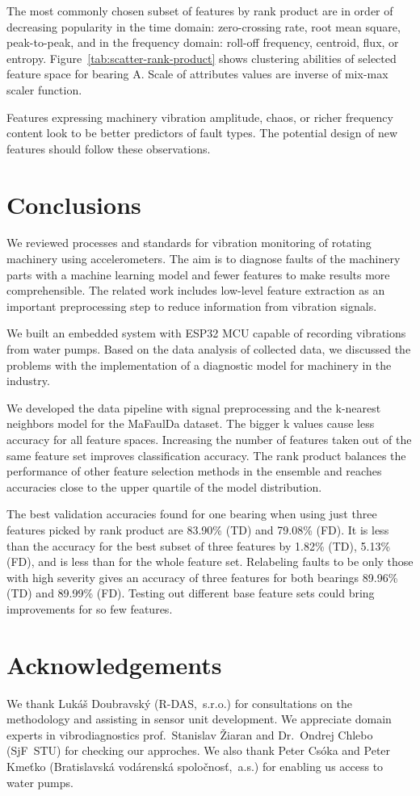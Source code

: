 \documentclass{llncs}
\begin{document}
The most commonly chosen subset of features by rank product are in order of decreasing popularity in the time domain: zero-crossing rate, root mean square, peak-to-peak, and in the frequency domain: roll-off frequency, centroid, flux, or entropy. Figure~\ref{tab:scatter-rank-product} shows clustering abilities of selected feature space for bearing A. Scale of attributes values are inverse of mix-max scaler function.

Features expressing machinery vibration amplitude, chaos, or richer frequency content look to be better predictors of fault types. The potential design of new features should follow these observations.

\section{Conclusions}
We reviewed processes and standards for vibration monitoring of rotating machinery using accelerometers. The aim is to diagnose faults of the machinery parts with a machine learning model and fewer features to make results more comprehensible. The related work includes low-level feature extraction as an important preprocessing step to reduce information from vibration signals. 

We built an embedded system with ESP32 MCU capable of recording vibrations from water pumps. Based on the data analysis of collected data, we discussed the problems with the implementation of a diagnostic model for machinery in the industry.

We developed the data pipeline with signal preprocessing and the k-nearest neighbors model for the MaFaulDa dataset. The bigger k values cause less accuracy for all feature spaces. Increasing the number of features taken out of the same feature set improves classification accuracy. The rank product balances the performance of other feature selection methods in the ensemble and reaches accuracies close to the upper quartile of the model distribution. 

The best validation accuracies found for one bearing when using just three features picked by rank product are 83.90\% (TD) and 79.08\% (FD). It is less than the accuracy for the best subset of three features by 1.82\% (TD), 5.13\% (FD), and is less than for the whole feature set. Relabeling faults to be only those with high severity gives an accuracy of three features for both bearings 89.96\% (TD) and 89.99\% (FD). Testing out different base feature sets could bring improvements for so few features.

\section*{Acknowledgements}
We thank Lukáš Doubravský (R-DAS,~s.r.o.) for consultations on the methodology and assisting in sensor unit development. We appreciate domain experts in vibrodiagnostics prof.~Stanislav Žiaran and Dr.~Ondrej Chlebo (SjF~STU) for checking our approches. We also thank Peter Csóka and Peter Kmeťko (Bratislavská vodárenská spoločnosť,~a.s.) for enabling us access to water pumps.

\printbibliography
\end{document}
